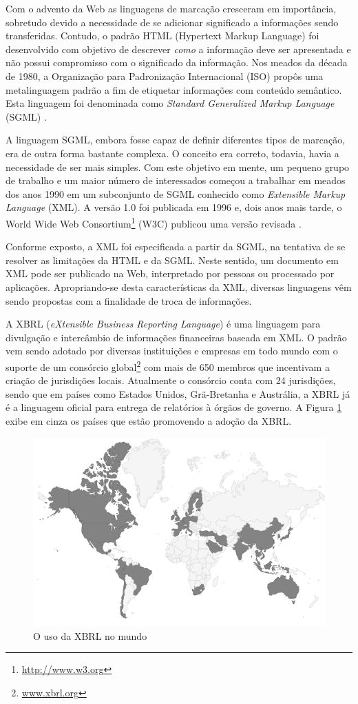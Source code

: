 \documentclass[msc,proposal,hidelot,hideabstract]{ppgccufmg} %
\begin{document}
Com o advento da Web as linguagens de marcação cresceram em importância, sobretudo devido a necessidade de se adicionar significado a informações sendo transferidas. Contudo, o padrão HTML (Hypertext
Markup Language) foi desenvolvido com objetivo de descrever \textit{como} a informação deve ser apresentada e não possui compromisso com o significado da informação. Nos meados da década de 1980,  a Organização para Padronização Internacional (ISO) propôs uma metalinguagem padrão a fim de etiquetar informações com conteúdo semântico. Esta linguagem foi denominada como \textit{Standard Generalized Markup Language} (SGML) \cite{smith1988sgml}.

A linguagem SGML, embora fosse capaz de definir diferentes tipos de marcação,
era de outra forma bastante complexa. O conceito era correto, todavia, havia a necessidade de ser mais simples. Com este objetivo em mente, um pequeno grupo de trabalho e um maior número de interessados começou a trabalhar em
meados dos anos 1990 em um subconjunto de SGML conhecido como \textit{Extensible Markup Language} (XML). A versão 1.0 foi publicada em 1996 e, dois anos mais tarde, o World Wide Web Consortium\footnote{\url{http://www.w3.org}} (W3C) publicou uma versão revisada \cite{Fawcett:2012:BX:2408362}{}.

Conforme exposto, a XML foi especificada a partir da SGML, na tentativa de se resolver as limitações da HTML
e da SGML. Neste sentido, um documento em XML pode ser publicado na Web, interpretado por pessoas
ou processado por aplicações. Apropriando-se desta características da XML, diversas linguagens vêm sendo propostas com a finalidade de troca de informações.

A XBRL (\textit{eXtensible Business Reporting Language}) é uma linguagem para
divulgação e intercâmbio de informações financeiras baseada em
XML\cite{xbrl_conceitos_aplicacoes}. O padrão vem sendo adotado por diversas
instituições e empresas em todo mundo com o suporte de um consórcio
global\footnote{\url{www.xbrl.org}} com mais de 650 membros que incentivam a
criação de jurisdições locais. Atualmente o consórcio conta com 24 jurisdições,
sendo que em países como  Estados Unidos, Grã-Bretanha e Austrália, a XBRL já é
a linguagem oficial para entrega de relatórios à órgãos de governo. A Figura
\ref{fig:world_map} exibe em cinza os países que estão promovendo a adoção da XBRL.

\begin{figure}[hbtp]
\centering
\includegraphics[width=.75\textwidth]{../img/world-map.png}
\caption{O uso da XBRL no mundo}
\label{fig:world_map}
\end{figure}
\end{document}
